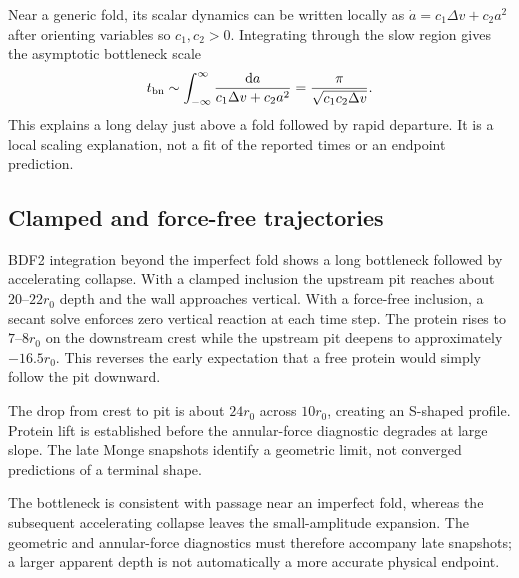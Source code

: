Near a generic fold, its scalar dynamics can be written locally as $\dot a=c_1\Delta v+c_2a^2$ after orienting variables so $c_1,c_2>0$. Integrating through the slow region gives the asymptotic bottleneck scale
\begin{equation}
t_{\rm bn}\sim\int_{-\infty}^{\infty}\frac{\mathrm{d} a}{c_1\Delta v+c_2a^2}
=\frac{\pi}{\sqrt{c_1c_2\Delta v}}.
\label{eq:fold-bottleneck}
\end{equation}
This explains a long delay just above a fold followed by rapid departure. It is a local scaling explanation, not a fit of the reported times or an endpoint prediction.

\subsection{Clamped and force-free trajectories}


BDF2 integration beyond the imperfect fold shows a long bottleneck followed by accelerating collapse. With a clamped inclusion the upstream pit reaches about $20$--$22r_0$ depth and the wall approaches vertical. With a force-free inclusion, a secant solve enforces zero vertical reaction at each time step. The protein rises to $7$--$8r_0$ on the downstream crest while the upstream pit deepens to approximately $-16.5r_0$. This reverses the early expectation that a free protein would simply follow the pit downward.

The drop from crest to pit is about $24r_0$ across $10r_0$, creating an S-shaped profile. Protein lift is established before the annular-force diagnostic degrades at large slope. The late Monge snapshots identify a geometric limit, not converged predictions of a terminal shape.






The bottleneck is consistent with passage near an imperfect fold, whereas the subsequent accelerating collapse leaves the small-amplitude expansion. The geometric and annular-force diagnostics must therefore accompany late snapshots; a larger apparent depth is not automatically a more accurate physical endpoint.



